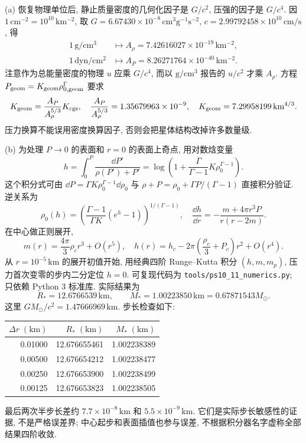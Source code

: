 \begin{solution}
(a) 恢复物理单位后, 静止质量密度的几何化因子是 $G/c^2$, 压强的因子是 $G/c^4$. 因 $1\,\mathrm{cm^{-2}}=10^{10}\,\mathrm{km^{-2}}$, 取 $G=6.67430\times10^{-8}\,\mathrm{cm^3g^{-1}s^{-2}}$, $c=2.99792458\times10^{10}\,\mathrm{cm/s}$, 得
\begin{align*}
1\,\mathrm{g/cm^3}&\longmapsto A_\rho=7.42616027\times10^{-19}\,\mathrm{km^{-2}},\\
1\,\mathrm{dyn/cm^2}&\longmapsto A_P=8.26271764\times10^{-40}\,\mathrm{km^{-2}}.
\end{align*}
注意作为总能量密度的物理 $u$ 应乘 $G/c^4$, 而以 $\mathrm{g/cm^3}$ 报告的 $u/c^2$ 才乘 $A_\rho$. 方程 $P_{\rm geom}=K_{\rm geom}\rho_{0,\rm geom}^\Gamma$ 要求
\[
K_{\rm geom}=\frac{A_P}{A_\rho^{5/3}}K_{\rm cgs},\quad
\frac{A_P}{A_\rho^{5/3}}=1.35679963\times10^{-9},\quad
K_{\rm geom}=7.29958199\,\mathrm{km^{4/3}}.
\]
压力换算不能误用密度换算因子, 否则会把星体结构改掉许多数量级.

(b) 为处理 $P\to0$ 的表面和 $r=0$ 的表面上奇点, 用对数焓变量
\[
h=\int_0^P\frac{\dd P'}{\rho(P')+P'}
=\log\left(1+\frac{\Gamma}{\Gamma-1}K\rho_0^{\Gamma-1}\right).
\]
这个积分式可由 $\dd P=\Gamma K\rho_0^{\Gamma-1}\dd\rho_0$ 与 $\rho+P=\rho_0+\Gamma P/(\Gamma-1)$ 直接积分验证. 逆关系为
\[
\rho_0(h)=\left(\frac{\Gamma-1}{\Gamma K}(e^h-1)\right)^{1/(\Gamma-1)},\quad
\frac{\dd h}{\dd r}=-\frac{m+4\pi r^3P}{r(r-2m)}.
\]
在中心做正则展开,
\[
m(r)=\frac{4\pi}{3}\rho_cr^3+O(r^5),\quad
h(r)=h_c-2\pi\left(\frac{\rho_c}{3}+P_c\right)r^2+O(r^4).
\]
从 $r=10^{-5}\,\mathrm{km}$ 的展开初值开始, 用经典四阶 Runge--Kutta 积分 $(h,m,m_p)$, 压力首次变零的步内二分定位 $h=0$. 可复现代码为 \texttt{tools/ps10\_11\_numerics.py}; 只依赖 Python 3 标准库. 实际结果为
\[
R_*=12.6766539\,\mathrm{km},\qquad
M_*=1.00223850\,\mathrm{km}=0.67871543M_\odot.
\]
这里 $GM_\odot/c^2=1.47666969\,\mathrm{km}$. 步长检查如下:
\begin{center}\begin{tabular}{rrr}\toprule
$\Delta r\;(\mathrm{km})$ & $R_*\;(\mathrm{km})$ & $M_*\;(\mathrm{km})$\\\midrule
0.01000 &12.676655461&1.002238389\\
0.00500 &12.676654212&1.002238477\\
0.00250 &12.676653900&1.002238499\\
0.00125 &12.676653823&1.002238505\\\bottomrule
\end{tabular}\end{center}
最后两次半步长差约 $7.7\times10^{-8}\,\mathrm{km}$ 和 $5.5\times10^{-9}\,\mathrm{km}$. 它们是实际步长敏感性的证据, 不是严格误差界; 中心起步和表面插值也参与误差, 不根据积分器名字虚称全部结果四阶收敛.


\end{solution}
